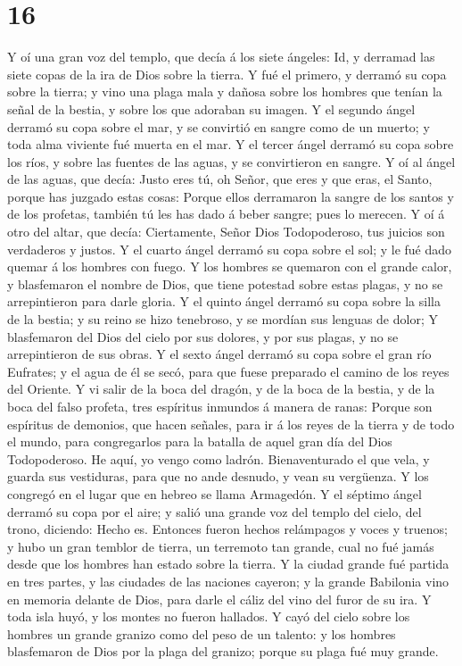 \hypertarget{section-15}{%
\section{16}\label{section-15}}

 Y oí una gran voz del templo, que decía á los siete
ángeles: Id, y derramad las siete copas de la ira de Dios sobre la
tierra.  Y fué el primero, y derramó su copa sobre la
tierra; y vino una plaga mala y dañosa sobre los hombres que tenían la
señal de la bestia, y sobre los que adoraban su imagen.  Y
el segundo ángel derramó su copa sobre el mar, y se convirtió en sangre
como de un muerto; y toda alma viviente fué muerta en el mar.
 Y el tercer ángel derramó su copa sobre los ríos, y sobre
las fuentes de las aguas, y se convirtieron en sangre.  Y oí
al ángel de las aguas, que decía: Justo eres tú, oh Señor, que eres y
que eras, el Santo, porque has juzgado estas cosas:  Porque
ellos derramaron la sangre de los santos y de los profetas, también tú
les has dado á beber sangre; pues lo merecen.  Y oí á otro
del altar, que decía: Ciertamente, Señor Dios Todopoderoso, tus juicios
son verdaderos y justos.  Y el cuarto ángel derramó su copa
sobre el sol; y le fué dado quemar á los hombres con fuego. 
Y los hombres se quemaron con el grande calor, y blasfemaron el nombre
de Dios, que tiene potestad sobre estas plagas, y no se arrepintieron
para darle gloria.  Y el quinto ángel derramó su copa sobre
la silla de la bestia; y su reino se hizo tenebroso, y se mordían sus
lenguas de dolor;  Y blasfemaron del Dios del cielo por sus
dolores, y por sus plagas, y no se arrepintieron de sus obras.
 Y el sexto ángel derramó su copa sobre el gran río
Eufrates; y el agua de él se secó, para que fuese preparado el camino de
los reyes del Oriente.  Y vi salir de la boca del dragón, y
de la boca de la bestia, y de la boca del falso profeta, tres espíritus
inmundos á manera de ranas:  Porque son espíritus de
demonios, que hacen señales, para ir á los reyes de la tierra y de todo
el mundo, para congregarlos para la batalla de aquel gran día del Dios
Todopoderoso.  He aquí, yo vengo como ladrón.
Bienaventurado el que vela, y guarda sus vestiduras, para que no ande
desnudo, y vean su vergüenza.  Y los congregó en el lugar
que en hebreo se llama Armagedón.  Y el séptimo ángel
derramó su copa por el aire; y salió una grande voz del templo del
cielo, del trono, diciendo: Hecho es.  Entonces fueron
hechos relámpagos y voces y truenos; y hubo un gran temblor de tierra,
un terremoto tan grande, cual no fué jamás desde que los hombres han
estado sobre la tierra.  Y la ciudad grande fué partida en
tres partes, y las ciudades de las naciones cayeron; y la grande
Babilonia vino en memoria delante de Dios, para darle el cáliz del vino
del furor de su ira.  Y toda isla huyó, y los montes no
fueron hallados.  Y cayó del cielo sobre los hombres un
grande granizo como del peso de un talento: y los hombres blasfemaron de
Dios por la plaga del granizo; porque su plaga fué muy grande.

